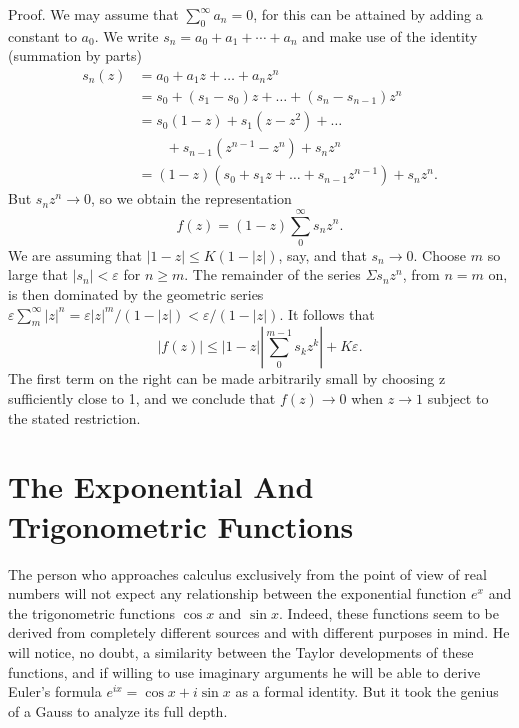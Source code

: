 Proof. We may assume that $\sum_{0}^{\infty} a_n = 0$, for this can be attained by adding
a constant to $a_{0}$. We write $s_{n} = a_{0} + a_{1} + \cdots + a_{n}$ and make use of the identity (summation by parts)
\begin{equation*}
\begin{aligned}
s_n(z)&=a_0+a_1z+\dots+a_nz^n\\
&=s_0+(s_1-s_0)z+\dots+(s_n-s_{n-1})z^n\\
&=s_0(1-z)+s_1(z-z^2)+\dots\\
&\qquad+s_{n-1}(z^{n-1}-z^n)+s_nz^n\\
&=(1-z)(s_0+s_1z+\dots+s_{n-1}z^{n-1})+s_nz^n.
\end{aligned}
\end{equation*}
But $s_n z^n \to 0$, so we obtain the representation
\begin{equation*}
f (z) = (1 - z) \sum_ {0} ^ {\infty} s _ {n} z ^ {n}.
\end{equation*}
We are assuming that $|1 - z| \leq K(1 - |z|)$, say, and that $s_n \to 0$. Choose $m$ so large that $|s_n| < \varepsilon$ for $n \geq m$. The remainder of the series $\Sigma s_n z^n$, from $n = m$ on, is then dominated by the geometric series $\varepsilon \sum_{m}^{\infty} |z|^n = \varepsilon |z|^m / (1 - |z|) < \varepsilon / (1 - |z|)$. It follows that
\begin{equation*}
| f (z) | \leq | 1 - z | \left| \sum_ {0} ^ {m - 1} s _ {k} z ^ {k} \right| + K \varepsilon .
\end{equation*}
The first term on the right can be made arbitrarily small by choosing z sufficiently close to 1, and we conclude that $f(z) \to 0$ when $z \to 1$ subject to the stated restriction.

\setcounter{section}{2}\section{The Exponential And Trigonometric Functions}\label{sec:2.3}
The person who approaches calculus exclusively from the point of view of real numbers will not expect any relationship between the exponential function $e^{x}$ and the trigonometric functions $\cos x$ and $\sin x$. Indeed, these functions seem to be derived from completely different sources and with different purposes in mind. He will notice, no doubt, a similarity between the Taylor developments of these functions, and if willing to use imaginary arguments he will be able to derive Euler's formula $e^{ix} = \cos x + i \sin x$ as a formal identity. But it took the genius of a Gauss to analyze its full depth.

